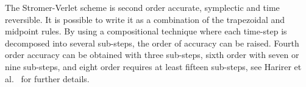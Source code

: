 \documentclass[11pt]{article}
\begin{document}
The Stromer-Verlet scheme is second order accurate, symplectic and time reversible. It is possible
to write it as a combination of the trapezoidal and midpoint rules. By using a
compositional technique where each time-step is decomposed into several sub-steps, the order of
accuracy can be raised. Fourth order accuracy can be obtained with three sub-steps, sixth order with
seven or nine sub-steps, and eight order requires at least fifteen sub-steps, see Harirer et
al.~\cite{HairerLubichWanner-06} for further details.



\end{document}
